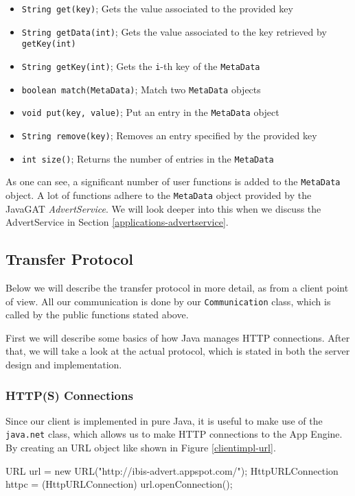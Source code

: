 \begin{itemize}
	\item \texttt{String get(key)}; Gets the value associated to the provided key 
	\item \texttt{String getData(int)}; Gets the value associated to the key
		retrieved by \texttt{getKey(int)}
	\item \texttt{String getKey(int)}; Gets the \texttt{i}-th key of the
		\texttt{MetaData}
	\item \texttt{boolean match(MetaData)}; Match two \texttt{MetaData} objects 
	\item \texttt{void put(key, value)}; Put an entry in the \texttt{MetaData} object 
	\item \texttt{String remove(key)}; Removes an entry specified by the provided
		key
	\item \texttt{int size()}; Returns the number of entries in the \texttt{MetaData} 
\end{itemize}

As one can see, a significant number of user functions is added to the
\texttt{MetaData} object. A lot of functions adhere to the \texttt{MetaData}
object provided by the JavaGAT \emph{AdvertService}. We will look deeper into
this when we discuss the AdvertService in Section
\ref{applications-advertservice}.

\subsection{Transfer Protocol}
Below we will describe the transfer protocol in more detail, as from a client
point of view. All our communication is done by our \texttt{Communication}
class, which is called by the public functions stated above. 

First we will describe some basics of how Java manages HTTP connections. After
that, we will take a look at the actual protocol, which is stated in both the
server design and implementation.

\subsubsection{HTTP(S) Connections}
Since our client is implemented in pure Java, it is useful to make use of the
\texttt{java.net} class, which allows us to make HTTP connections to the
App Engine. By creating an URL object like shown in Figure \ref{clientimpl-url}.

\begin{figure*}[ht] %
\begin{center}
\begin{code}
URL url = new URL("http://ibis-advert.appspot.com/");
HttpURLConnection httpc = (HttpURLConnection) url.openConnection();
\end{code}
\caption{Opening an HTTP Connection.\label{clientimpl-url}}
\end{center}
\end{figure*}

